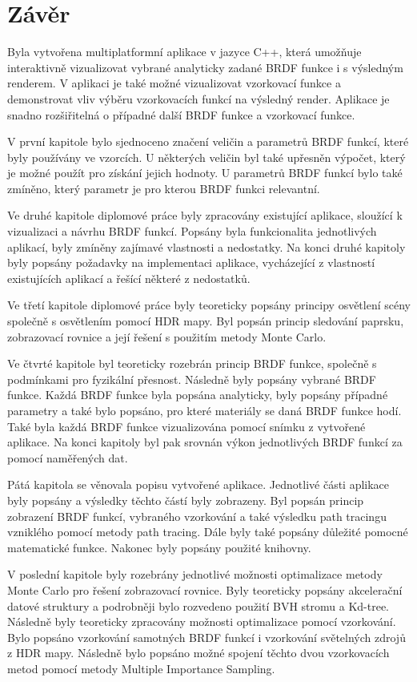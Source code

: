 \documentclass[czech,master]{diploma}
\begin{document}
\chapter{Závěr}
Byla vytvořena multiplatformní aplikace v jazyce C++, která umožňuje interaktivně vizualizovat vybrané analyticky zadané BRDF funkce i s výsledným renderem. V aplikaci je také možné vizualizovat vzorkovací funkce a demonstrovat vliv výběru vzorkovacích funkcí na výsledný render. Aplikace je snadno rozšiřitelná o případné další BRDF funkce a vzorkovací funkce.\par
V první kapitole bylo sjednoceno značení veličin a parametrů BRDF funkcí, které byly používány ve vzorcích. U některých veličin byl také upřesněn výpočet, který je možné použít pro získání jejich hodnoty. U parametrů BRDF funkcí bylo také zmíněno, který parametr je pro kterou BRDF funkci relevantní. \par
Ve druhé kapitole diplomové práce byly zpracovány existující aplikace, sloužící k vizualizaci a návrhu BRDF funkcí. Popsány byla funkcionalita jednotlivých aplikací, byly zmíněny zajímavé vlastnosti a nedostatky. Na konci druhé kapitoly byly popsány požadavky na implementaci aplikace, vycházející z vlastností existujících aplikací a řešící některé z nedostatků.\par
Ve třetí kapitole diplomové práce byly teoreticky popsány principy osvětlení scény společně s osvětlením pomocí HDR mapy. Byl popsán princip sledování paprsku, zobrazovací rovnice a její řešení s použitím metody Monte Carlo.\par
Ve čtvrté kapitole byl teoreticky rozebrán princip BRDF funkce, společně s podmínkami pro fyzikální přesnost. Následně byly popsány vybrané BRDF funkce. Každá BRDF funkce byla popsána analyticky, byly popsány případné parametry a také bylo popsáno, pro které materiály se daná BRDF funkce hodí. Také byla každá BRDF funkce vizualizována pomocí snímku z vytvořené aplikace. Na konci kapitoly byl pak srovnán výkon jednotlivých BRDF funkcí za pomocí naměřených dat.\par
Pátá kapitola se věnovala popisu vytvořené aplikace. Jednotlivé části aplikace byly popsány a výsledky těchto částí byly zobrazeny. Byl popsán princip zobrazení BRDF funkcí, vybraného vzorkování a také výsledku path tracingu vzniklého pomocí metody path tracing. Dále byly také popsány důležité pomocné matematické funkce. Nakonec byly popsány použité knihovny.\par
V poslední kapitole byly rozebrány jednotlivé možnosti optimalizace metody Monte Carlo pro řešení zobrazovací rovnice. Byly teoreticky popsány akcelerační datové struktury a podrobněji bylo rozvedeno použití BVH stromu a Kd-tree. Následně byly teoreticky zpracovány možnosti optimalizace pomocí vzorkování. Bylo popsáno vzorkování samotných BRDF funkcí i vzorkování světelných zdrojů z HDR mapy. Následně bylo popsáno možné spojení těchto dvou vzorkovacích metod pomocí metody Multiple Importance Sampling.\par
\end{document}
